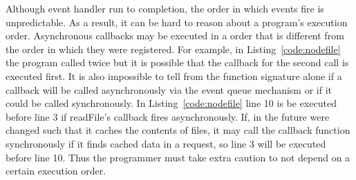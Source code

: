 
Although event handler run to completion, the order in which events fire
is unpredictable.  As a result, it can be hard to reason about a program's
execution order.
Asynchronous callbacks may be executed in a order that is different 
from the order in which they were registered.
For example, in Listing~\ref{code:nodefile} the program called 
twice but it is possible that the callback for the second  call
is executed first.
It is also impossible to tell from the function signature alone if a 
callback will be called asynchronously via the event queue mechanism or if
it could be called synchronously. In Listing~\ref{code:nodefile} line 10 is
be executed before line 3 if readFile's callback fires asynchronously. 
If, in the future  were changed such
that it caches the contents of files, it may call the callback function synchronously
if it finds cached data in a request, so line 3 will be executed before line 10.
Thus the programmer must take extra caution to not depend on a certain execution
order.



